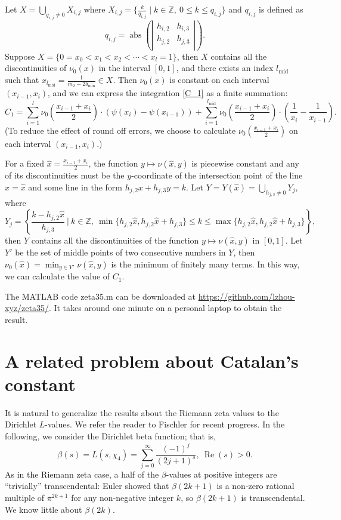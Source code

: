 \documentclass[11pt]{amsart}
\numberwithin{equation}{section}
\begin{document}
Let $X=\bigcup_{q_{i,j}\neq 0}X_{i,j}$ where $X_{i,j}=\{\frac{k}{q_{i,j}} \mid k\in\mathbb{Z}, \ 0 \leqslant k \leqslant q_{i,j} \}$ and $q_{i,j}$ is defined as
\[
q_{i,j} = \operatorname{abs} \left(
\left|\begin{array}{cc}
    h_{i,2}   & h_{i,3}\\
    h_{j,2}   & h_{j,3}\\
\end{array}\right| \right).
\]
Suppose $X=\{0=x_0<x_1<x_2<\cdots<x_l=1\}$, then $X$ contains all the discontinuities of $\nu_0(x)$ in the interval $[0,1]$, and there exists an index $l_{\text{mid}}$ such that $x_{l_{\text{mid}}}=\frac{1}{m_2-2\delta_{\min}} \in X$. Then $\nu_0(x)$ is constant on each interval $(x_{i-1},x_{i})$, and we can express the integration \eqref{C_1} as a finite summation:
\[ C_1 = \sum_{i=1}^{l} \nu_0\left(\frac{x_{i-1}+x_{i}}{2}\right)\cdot(\psi(x_{i})-\psi(x_{i-1})) +
\sum_{i=1}^{l_{\text{mid}}} \nu_0\left(\frac{x_{i-1}+x_{i}}{2}\right)\cdot\left(\frac{1}{x_{i}}-\frac{1}{x_{i-1}}\right). \]
(To reduce the effect of round off errors, we choose to calculate $\nu_0\left(\frac{x_{i-1}+x_{i}}{2}\right)$ on each interval $(x_{i-1},x_i)$.)

For a fixed $\hat{x} = \frac{x_{i-1}+x_{i}}{2}$, the function $y \mapsto \nu(\hat{x},y)$ is piecewise constant and any of its discontinuities must be the $y$-coordinate of the intersection point of the line $x = \hat{x}$ and some line in the form $h_{j,2}x + h_{j,3}y = k$. Let $Y = Y(\hat{x}) = \bigcup_{h_{j,3}\neq 0}Y_{j}$, where
\[
Y_j=\left\{\frac{k-h_{j,2}\hat{x}}{h_{j,3}} ~\Bigg|~ k \in \mathbb{Z},~
\min\{h_{j,2}\hat{x},h_{j,2}\hat{x}+h_{j,3}\} \leqslant k \leqslant \max\{h_{j,2}\hat{x},h_{j,2}\hat{x}+h_{j,3}\}
 \right\},
\]
then $Y$ contains all the discontinuities of the function $y \mapsto \nu(\hat{x},y)$ in $[0,1]$. Let $Y'$ be the set of middle points of two consecutive numbers in $Y$, then $\nu_0(\hat{x}) = \min_{y \in Y'} \nu(\hat{x},y)$ is the minimum of finitely many terms. In this way, we can calculate the value of $C_1$.

The MATLAB code \textsf{zeta35.m} can be downloaded at \url{https://github.com/lzhou-xyz/zeta35/}. It takes around one minute on a personal laptop to obtain the result.

\section{A related problem about Catalan's constant}
It is natural to generalize the results about the Riemann zeta values to the Dirichlet $L$-values. We refer the reader to Fischler \cite{Fi20} for recent progress. In the following, we consider the Dirichlet beta function; that is,
\[ \beta(s) = L(s,\chi_4) = \sum_{j=0}^{\infty} \frac{(-1)^j}{(2j+1)^s},~\operatorname{Re}(s) > 0.  \]
As in the Riemann zeta case, a half of the $\beta$-values at positive integers are ``trivially'' transcendental: Euler showed that $\beta(2k+1)$ is a non-zero rational multiple of $\pi^{2k+1}$ for any non-negative integer $k$, so $\beta(2k+1)$ is transcendental. We know little about $\beta(2k)$.
\end{document}
